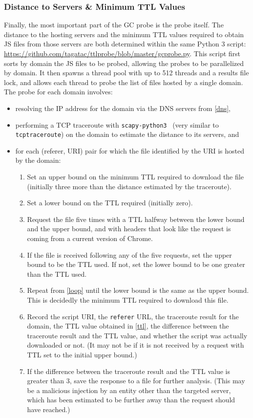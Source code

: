 \subsubsection{Distance to Servers \& Minimum TTL Values}\label{distance-ttl}
Finally, the most important part of the GC probe is the probe itself.
The distance to the hosting servers and the minimum TTL values required to obtain JS files from those servers are both determined within the same Python 3 script: \url{https://github.com/tagatac/ttlprobe/blob/master/gcprobe.py}.
This script first sorts by domain the JS files to be probed, allowing the probes to be parallelized by domain.
It then spawns a thread pool with up to 512 threads and a results file lock, and allows each thread to probe the list of files hosted by a single domain.
The probe for each domain involves:
\begin{itemize}\addtolength{\itemsep}{-.35\baselineskip}
	\item resolving the IP address for the domain via the DNS servers from \autoref{dns},
	\item performing a TCP traceroute with \texttt{scapy-python3}~\cite{Dobelis2015} (very similar to \texttt{tcptraceroute}) on the domain to estimate the distance to its servers, and
	\item for each (referer, URI) pair for which the file identified by the URI is hosted by the domain:
	\begin{enumerate}
		\item Set an upper bound on the minimum TTL required to download the file (initially three more than the distance estimated by the traceroute).
		\item Set a lower bound on the TTL required (initially zero).
		\item\label{loop} Request the file five times with a TTL halfway between the lower bound and the upper bound, and with headers that look like the request is coming from a current version of Chrome.
		\item If the file is received following any of the five requests, set the upper bound to be the TTL used.
			If not, set the lower bound to be one greater than the TTL used.
		\item\label{ttl} Repeat from \ref{loop} until the lower bound is the same as the upper bound.
			This is decidedly the minimum TTL required to download this file.
		\item Record the script URI, the \texttt{referer} URL, the traceroute result for the domain, the TTL value obtained in \ref{ttl}, the difference between the traceroute result and the TTL value, and whether the script was actually downloaded or not.
			(It may not be if it is not received by a request with TTL set to the initial upper bound.)
		\item If the difference between the traceroute result and the TTL value is greater than 3, save the response to a file for further analysis.
			(This may be a malicious injection by an entity other than the targeted server, which has been estimated to be further away than the request should have reached.)
	\end{enumerate}
\end{itemize}
